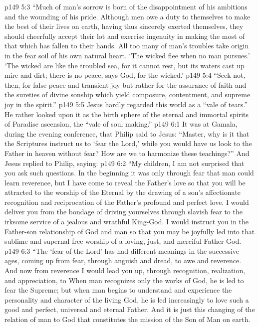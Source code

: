 \vs p149 5:3 \textcolor{ubdarkred}{“Much of man’s sorrow is born of the disappointment of his ambitions and the wounding of his pride. Although men owe a duty to themselves to make the best of their lives on earth, having thus sincerely exerted themselves, they should cheerfully accept their lot and exercise ingenuity in making the most of that which has fallen to their hands. All too many of man’s troubles take origin in the fear soil of his own natural heart. ‘The wicked flee when no man pursues.’ ‘The wicked are like the troubled sea, for it cannot rest, but its waters cast up mire and dirt; there is no peace, says God, for the wicked.’}
\vs p149 5:4 \textcolor{ubdarkred}{“Seek not, then, for false peace and transient joy but rather for the assurance of faith and the sureties of divine sonship which yield composure, contentment, and supreme joy in the spirit.”}
\pc \vs p149 5:5 Jesus hardly regarded this world as a “vale of tears.” He rather looked upon it as the birth sphere of the eternal and immortal spirits of Paradise ascension, the “vale of soul making.”
\vs p149 6:1 It was at Gamala, during the evening conference, that Philip said to Jesus: “Master, why is it that the Scriptures instruct us to ‘fear the Lord,’ while you would have us look to the Father in heaven without fear? How are we to harmonize these teachings?” And Jesus replied to Philip, saying:
\pc \vs p149 6:2 \textcolor{ubdarkred}{“My children, I am not surprised that you ask such questions. In the beginning it was only through fear that man could learn reverence, but I have come to reveal the Father’s love so that you will be attracted to the worship of the Eternal by the drawing of a son’s affectionate recognition and reciprocation of the Father’s profound and perfect love. I would deliver you from the bondage of driving yourselves through slavish fear to the irksome service of a jealous and wrathful King\hyp{}God. I would instruct you in the Father\hyp{}son relationship of God and man so that you may be joyfully led into that sublime and supernal free worship of a loving, just, and merciful Father\hyp{}God.}
\vs p149 6:3 \textcolor{ubdarkred}{“The ‘fear of the Lord’ has had different meanings in the successive ages, coming up from fear, through anguish and dread, to awe and reverence. And now from reverence I would lead you up, through recognition, realization, and appreciation, to  When man recognizes only the works of God, he is led to fear the Supreme; but when man begins to understand and experience the personality and character of the living God, he is led increasingly to love such a good and perfect, universal and eternal Father. And it is just this changing of the relation of man to God that constitutes the mission of the Son of Man on earth.}
